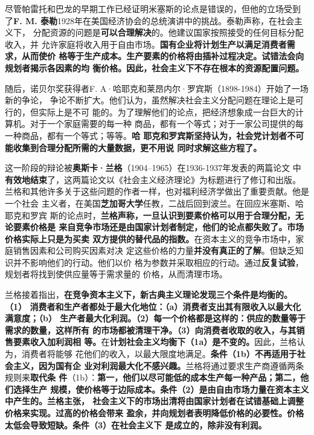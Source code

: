 尽管帕雷托和巴龙的早期工作已经证明米塞斯的论点是错误的，但他的立场受到
了\textbf{F. M. 泰勒}1928年在美国经济协会的总统演讲中的挑战。泰勒声称，在社会主义下，
分配资源的问题是\textbf{可以合理解决}的。他建议国家按照接受的任何目标分配收入，并
允许家庭将收入用于自由市场。\textbf{国有企业将计划生产以满足消费者需求，从而使价
  格等于生产成本。生产要素的价格将由插补过程决定。试错法会向规划者揭示各因素的均
  衡价格。因此，社会主义下不存在根本的资源配置问题。}

随后，诺贝尔奖获得者F. A·哈耶克和莱昂内尔·罗宾斯（1898-1984）开始了一场新的争论，
争论不断扩大。他们认为，虽然解决社会主义分配问题在理论上是可行的，但实际上是不可
能的。为了理解他们的论点，把经济想象成一台巨大的计算机。对于一个家庭需要的每一种
商品，都有一个等式；对于一家公司提供的每一种商品，都有一个等式；等等。\textbf{哈
  耶克和罗宾斯坚持认为，社会党计划者不可能收集到合理分配所需的大量数据，更不用说
  同时求解这些方程了。}

这一阶段的辩论被\textbf{奥斯卡·兰格}（1904--1965）在1936-1937年发表的两篇论文
中\textbf{有效地结束}了，这两篇论文以《社会主义经济理论》为标题进行了修订和出版。
兰格和其他许多关于这些问题的作者一样，也对福利经济学做出了重要贡献。他是一个社会
主义者，在美国\textbf{芝加哥大学}任教，二战后回到波兰。在回应米塞斯、哈耶克和罗宾
斯的论点时，\textbf{兰格声称，一旦认识到要素价格可以用于合理分配，无论要素价格是
  来自竞争市场还是由国家计划者制定，他们的论点都失败了。市场价格实际上只是为买卖
  双方提供的替代品的指数。}在资本主义的竞争市场中，家庭销售因素和公司购买因素对决
定这些价格的力量\textbf{并没有真正的了解}。但缺乏知识并不影响他们的行动。他们以价
格为参数并采取相应的行动。通过\textbf{反复试验}，规划者将找到使供应量等于需求量的
价格，从而清理市场。

兰格接着指出，\textbf{在竞争资本主义下，新古典主义理论发现三个条件是均衡的。（1）
  消费者和生产者都处于最大化地位：（a）消费者支出其有限收入以最大化满意度；（b）
  生产者最大化利润。（2）每一个价格都是这样的：供应的数量等于需求的数量，这样所有
  的市场都被清理干净。（3）向消费者收取的收入，与其销售要素收入加利润相
  等。}在\textbf{计划社会主义均衡下（1a）是不变的。}因此，兰格认为，消费者将能够
花他们的收入，以最大限度地满足。\textbf{条件（1b）不再适用于社会主义，因为国有企
  业对利润最大化不感兴趣。}兰格将通过要求生产商遵循两条规则来\textbf{取代条
  件}（1b）：\textbf{第一，他们以尽可能低的成本生产每一种产品；第二，他们选择生产
  规模，使价格等于边际成本。条件（2）是由自由市场力量在资本主义中产生的。兰格主张，
  社会主义下的市场出清将由国家计划者在试错基础上调整价格来实现。过高的价格会带来
  盈余，并向规划者表明降低价格的必要性。价格太低会导致短缺。条件（3）在社会主义下
  是成立的，除非没有利润。}

